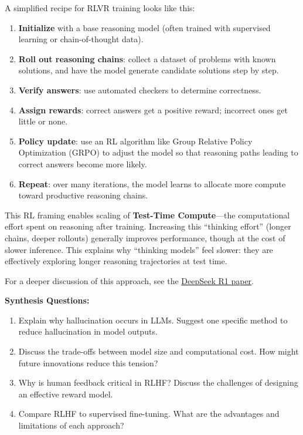 A simplified recipe for RLVR training looks like this:  
\begin{enumerate}
    \item \textbf{Initialize} with a base reasoning model (often trained with supervised learning or chain-of-thought data).  
    \item \textbf{Roll out reasoning chains}: collect a dataset of problems with known solutions, and have the model generate candidate solutions step by step.  
    \item \textbf{Verify answers}: use automated checkers to determine correctness.  
    \item \textbf{Assign rewards}: correct answers get a positive reward; incorrect ones get little or none.  
    \item \textbf{Policy update}: use an RL algorithm like Group Relative Policy Optimization (GRPO) to adjust the model so that reasoning paths leading to correct answers become more likely.  
    \item \textbf{Repeat}: over many iterations, the model learns to allocate more compute toward productive reasoning chains.  
\end{enumerate}

This RL framing enables scaling of \textbf{Test-Time Compute}---the computational effort spent on reasoning after training. Increasing this ``thinking effort'' (longer chains, deeper rollouts) generally improves performance, though at the cost of slower inference. This explains why ``thinking models'' feel slower: they are effectively exploring longer reasoning trajectories at test time.  

For a deeper discussion of this approach, see the \href{https://arxiv.org/abs/2501.12948}{DeepSeek R1 paper}.  

\begin{questionbox}
\textbf{Synthesis Questions:}

\begin{enumerate}
    \item Explain why hallucination occurs in LLMs. Suggest one specific method to reduce hallucination in model outputs.
    \item Discuss the trade-offs between model size and computational cost. How might future innovations reduce this tension?
    \item Why is human feedback critical in RLHF? Discuss the challenges of designing an effective reward model.
    \item Compare RLHF to supervised fine-tuning. What are the advantages and limitations of each approach?
\end{enumerate}
\end{questionbox}

